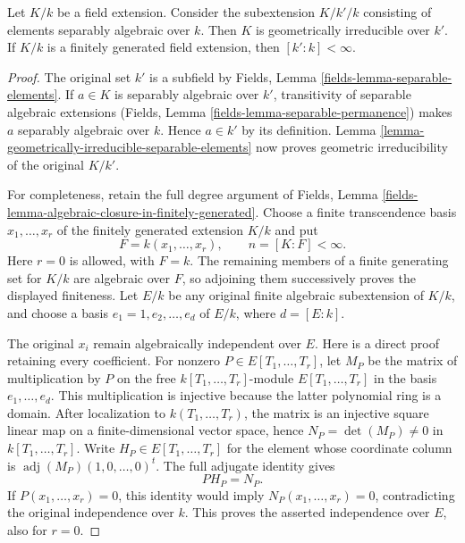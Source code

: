 \begin{lemma}
\label{lemma-make-geometrically-irreducible}
Let $K/k$ be a field extension. Consider the subextension $K/k'/k$ consisting
of elements separably algebraic over $k$. Then $K$ is geometrically irreducible
over $k'$. If $K/k$ is a finitely generated field extension, then
$[k' : k] < \infty$.
\end{lemma}

\begin{proof}
The original set $k'$ is a subfield
by Fields, Lemma \ref{fields-lemma-separable-elements}.
If $a\in K$ is separably algebraic
over $k'$, transitivity of separable
algebraic extensions (Fields, Lemma
\ref{fields-lemma-separable-permanence})
makes $a$ separably algebraic over
$k$. Hence $a\in k'$ by its
definition. Lemma
\ref{lemma-geometrically-irreducible-separable-elements}
now proves geometric irreducibility
of the original $K/k'$.

For completeness, retain the full
degree argument of Fields, Lemma
\ref{fields-lemma-algebraic-closure-in-finitely-generated}.
Choose a finite transcendence basis
$x_1,\ldots,x_r$ of the finitely
generated extension $K/k$ and put
$$
F=k(x_1,\ldots,x_r),\qquad n=[K:F]<\infty.
$$
Here $r=0$ is allowed, with $F=k$.
The remaining members of a finite
generating set for $K/k$ are
algebraic over $F$, so adjoining
them successively proves the
displayed finiteness. Let $E/k$
be any original finite algebraic
subextension of $K/k$, and choose
a basis $e_1=1,e_2,\ldots,e_d$ of
$E/k$, where $d=[E:k]$.

The original $x_i$ remain
algebraically independent over $E$.
Here is a direct proof retaining
every coefficient. For nonzero
$P\in E[T_1,\ldots,T_r]$, let $M_P$
be the matrix of multiplication
by $P$ on the free $k[T_1,\ldots,T_r]$-module
$E[T_1,\ldots,T_r]$ in the basis
$e_1,\ldots,e_d$. This multiplication
is injective because the latter
polynomial ring is a domain.
After localization to $k(T_1,\ldots,T_r)$,
the matrix is an injective square
linear map on a finite-dimensional
vector space, hence
$N_P=\det(M_P)\neq0$ in $k[T_1,\ldots,T_r]$.
Write $H_P\in E[T_1,\ldots,T_r]$
for the element whose coordinate
column is $\operatorname{adj}(M_P)(1,0,\ldots,0)^t$.
The full adjugate identity gives
$$
P H_P=N_P.
$$
If $P(x_1,\ldots,x_r)=0$, this
identity would imply
$N_P(x_1,\ldots,x_r)=0$, contradicting
the original independence over $k$.
This proves the asserted independence
over $E$, also for $r=0$.


\end{proof}
